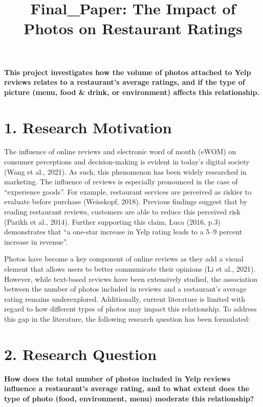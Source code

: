 \documentclass[
]{article}
\title{Final\_Paper: The Impact of Photos on Restaurant Ratings}
\author{}
\date{\vspace{-2.5em}}
\begin{document}
\maketitle

{
\setcounter{tocdepth}{2}
\tableofcontents
}
\textbf{This project investigates how the volume of photos attached to
Yelp reviews relates to a restaurant's average ratings, and if the type
of picture (menu, food \& drink, or environment) affects this
relationship.}

\section{1. Research Motivation}\label{research-motivation}

The influence of online reviews and electronic word of mouth (eWOM) on
consumer perceptions and decision-making is evident in today's digital
society (Wang et al., 2021). As such, this phenomenon has been widely
researched in marketing. The influence of reviews is especially
pronounced in the case of ``experience goods''. For example, restaurant
services are perceived as riskier to evaluate before purchase
(Weisskopf, 2018). Previous findings suggest that by reading restaurant
reviews, customers are able to reduce this perceived risk (Parikh et
al., 2014). Further supporting this claim, Luca (2016, p.3) demonstrates
that ``a one-star increase in Yelp rating leads to a 5--9 percent
increase in revenue''.

Photos have become a key component of online reviews as they add a
visual element that allows users to better communicate their opinions
(Li et al., 2021). However, while text-based reviews have been
extensively studied, the association between the number of photos
included in reviews and a restaurant's average rating remains
underexplored. Additionally, current literature is limited with regard
to how different types of photos may impact this relationship. To
address this gap in the literature, the following research question has
been formulated:

\section{2. Research Question}\label{research-question}

\textbf{How does the total number of photos included in Yelp reviews
influence a restaurant's average rating, and to what extent does the
type of photo (food, environment, menu) moderate this relationship?}
\end{document}

